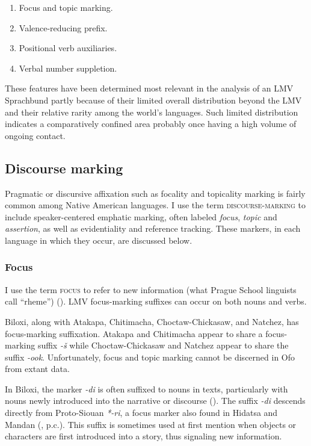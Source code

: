 \documentclass[output=paper]{LSP/langsci}
\begin{document}
\begin{enumerate}
\item{Focus and topic marking.}
\item{Valence-reducing prefix.}
\item{Positional verb auxiliaries.}
\item{Verbal number suppletion.}
\end{enumerate}
 
These features have been determined most relevant in the analysis of an LMV Sprachbund partly because of their limited overall distribution beyond the LMV and their relative rarity among the world’s languages. Such limited distribution indicates a comparatively confined area probably once having a high volume of ongoing contact.

\subsection{Discourse marking}

Pragmatic or discursive affixation such as focality and topicality marking is fairly common among Native American languages. I use the term \textsc{discourse-marking} to include speaker-centered emphatic marking, often labeled \emph{focus}, \emph{topic} and \emph{assertion}, as well as evidentiality and reference tracking. These markers, in each language in which they occur, are discussed below.

\subsubsection{Focus}
	
I use the term \textsc{focus} to refer to new information (what Prague School linguists call “rheme”) (\citealt[271]{Payne1997}). LMV focus-marking suffixes can occur on both nouns and verbs.

	Biloxi, along with Atakapa, Chitimacha, Choctaw-Chickasaw, and Natchez, has focus-marking suffixation. Atakapa and Chitimacha appear to share a focus-marking suffix \emph{-š} while Choctaw-Chickasaw and Natchez appear to share the suffix \emph{-ook}. Unfortunately, focus and topic marking cannot be discerned in Ofo from extant data.

In Biloxi, the marker \emph{-di} is often suffixed to nouns in texts, particularly with nouns newly introduced into the narrative or discourse (\citealt[3]{Kaufman2011}). The suffix \emph{-di} descends directly from Proto-Siouan \emph{*-ri}, a focus marker also found in Hidatsa and Mandan (\citealt[3]{Boyle2007}, p.c.). This suffix is sometimes used at first mention when objects or characters are first introduced into a story, thus signaling new information. 
\end{document}
